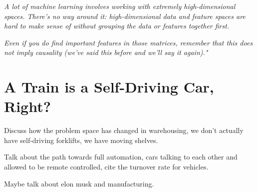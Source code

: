 \textit{A lot of machine learning involves working with extremely high-dimensional spaces. There's no way around it: high-dimensional data and feature spaces are hard to make sense of without grouping the data or features together first.}

\textit{Even if you do find important features in those matrices, remember that this does not imply causality (we've said this before and we'll say it again)."} \cite{trustworthyml}

\section{A Train is a Self-Driving Car, Right?}

Discuss how the problem space has changed in warehousing, we don't actually have self-driving forklifts, we have moving shelves.

Talk about the path towards full automation, cars talking to each other and allowed to be remote controlled, cite the turnover rate for vehicles.

Maybe talk about elon musk and manufacturing.

